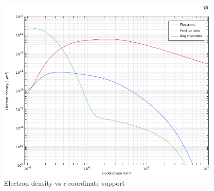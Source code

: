 \begin{figure}[p]
	\centering
	\includegraphics[scale=0.25]{images/results images/Comsol images/Electron density.png}
	\caption{Electron density vs r coordinate
	support}
\end{figure}


